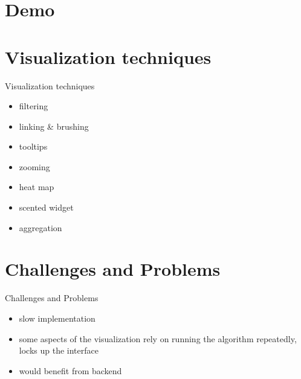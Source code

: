 \documentclass[naustrian]{beamer}
\begin{document}
{
\section{Demo}
}


\section{Visualization techniques}

\begin{frame}{Visualization techniques}
    \begin{itemize}
        \item filtering
        \item linking \& brushing
        \item tooltips
        \item zooming
        \item heat map
        \item scented widget
        \item aggregation
    \end{itemize}
\end{frame}

\section{Challenges and Problems}

\begin{frame}{Challenges and Problems}
    \begin{itemize}
        \item slow implementation
        \item some aspects of the visualization rely on running the algorithm repeatedly, locks up the interface
        \item would benefit from backend
    \end{itemize}
\end{frame}

\end{document}
